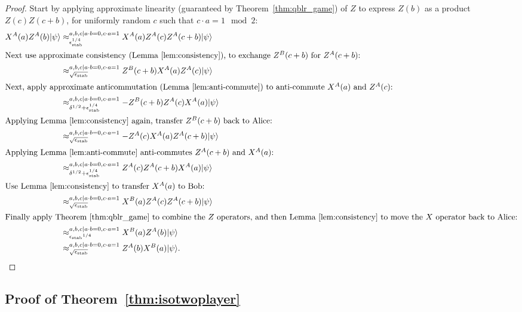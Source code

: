 \documentclass[11pt,letterpaper]{article}
\newcommand{\<}{\langle}
\renewcommand{\>}{\rangle}
\newcommand{\thmref}[1]{Theorem~\ref{thm:#1}}
\newcommand{\lemref}[1]{Lemma~\ref{lem:#1}}
\newcommand{\ket}[1]{| #1 \>}
\newcommand{\eps}{\epsilon}
\newcommand{\stab}{\ensuremath{\rm stab}}
\newcommand{\app}[2]{\approx_{#1}^{#2}}
\begin{document}
\begin{proof}
Start by applying approximate linearity
(guaranteed by \thmref{qblr_game}) of $Z$ to express $Z(b)$ as a product $Z(c)Z(c+b)$, for uniformly random $c$ such that $c\cdot a =1\mod 2$:
\begin{align*}
X^A(a) Z^A(b)\ket{\psi}   &\approx_{\eps_{\stab}^{1/4}}^{a,b,c| a \cdot b = 0, c\cdot a= 1} X^A(a)
                                             Z^A(c) Z^A(c + b)
                                             \ket{\psi} \\
\intertext{Next use approximate consistency (\lemref{consistency}), to exchange $Z^B(c+b)$ for $Z^A(c+b)$:}
                                        &\app{\sqrt{\eps_{\stab}}}{a,b,c| a \cdot b = 0, c\cdot a= 1} {Z^B}(c+b) X^A(a) Z^A(c) \ket{\psi} \\
  \intertext{Next, apply approximate anticommutation (\lemref{anti-commute}) to anti-commute $X^A(a)$ and $Z^A(c)$:}
                                        &\app{\delta^{1/2}+\eps_{\stab}^{1/4}}{a,b,c| a \cdot b = 0, c\cdot a= 1} -{Z^B}(c +
                                          b) Z^A(c) X^A(a) \ket{\psi}  \\
\intertext{Applying \lemref{consistency} again, transfer $Z^B(c + b)$ back to Alice:}
                          &\app{\sqrt{\eps_{\stab}}}{a,b,c | a \cdot b = 0, c\cdot a = 1} -Z^A(c) X^A(a) Z^A(c+b) \ket{\psi} \\
\intertext{Applying \lemref{anti-commute} anti-commutes $Z^A(c+b)$ and $X^A(a)$:}
                                        &\app{\delta^{1/2}+\eps_{\stab}^{1/4}}{a,b,c| a \cdot b = 0, c\cdot a= 1} Z^A(c) Z^A(c+b)
                                          X^A(a) \ket{\psi} \\
\intertext{Use \lemref{consistency} to transfer $X^A(a)$ to Bob:}
                                        &\app{\sqrt{\eps_{\stab}}}{a,b,c| a \cdot b = 0, c\cdot a= 1} X^B(a) Z^A(c) Z^A(c+b) \ket{\psi} \\
\intertext{Finally apply \thmref{qblr_game} to combine the $Z$ operators, and then \lemref{consistency} to move the $X$ operator back to Alice:}
                          &\app{{\eps_{\stab}}^{1/4}}{a,b,c|a \cdot b = 0, c \cdot a = 1} X^B(a) Z^A(b) \ket{\psi} \\
                          &\app{\sqrt{\eps_{\stab}}}{a,b,c|a \cdot b  = 0, c \cdot a = 1} Z^A(b) X^B(a) \ket{\psi}.
\end{align*}

\end{proof}


\subsection{Proof of Theorem~\ref{thm:isotwoplayer}}
\label{sec:istwoplayer}
\end{document}
